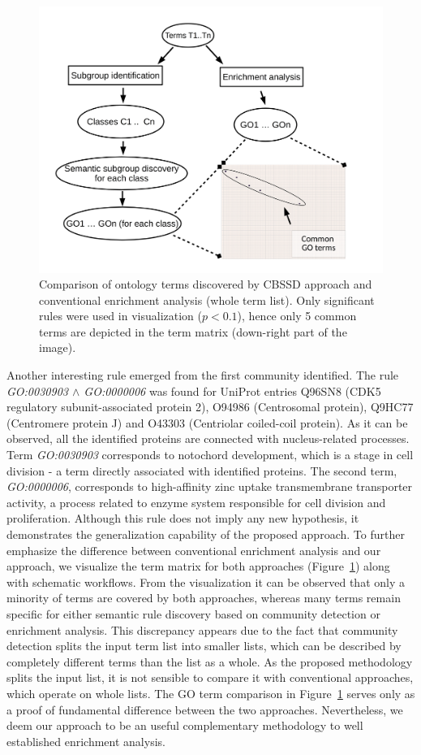 \documentclass[oribibl,runningheads,a4paper]{llncs}
\begin{document}
\begin{figure}[!h]
\centering
\includegraphics[scale=0.9]{result_nicer}
\caption{Comparison of ontology terms discovered by CBSSD approach and conventional enrichment analysis (whole term list). Only significant rules were used in visualization ($p<0.1$), hence only 5 common terms are depicted in the term matrix (down-right part of the image).}
\label{fig:example3}
\end{figure}

Another interesting rule emerged from the first community identified. The rule \emph{GO:0030903 $\wedge$  GO:0000006} was found for UniProt entries Q96SN8  (CDK5 regulatory subunit-associated protein 2), O94986 (Centrosomal protein), Q9HC77 (Centromere protein J) and O43303 (Centriolar coiled-coil protein). As it can be observed, all the identified proteins are connected with nucleus-related processes. Term \emph{GO:0030903} corresponds to notochord development, which is a stage in cell division - a term directly associated with identified proteins. The second term, \emph{GO:0000006}, corresponds to high-affinity zinc uptake transmembrane transporter activity, a process related to enzyme system responsible for cell division and proliferation. Although this rule does not imply any new hypothesis, it demonstrates the generalization capability of the proposed approach. To further emphasize the difference between conventional enrichment analysis and our approach, we visualize the term matrix for both approaches (Figure~\ref{fig:example3}) along with schematic workflows. From the visualization it can be observed that only a minority of terms are covered by both approaches, whereas many terms remain specific for either semantic rule discovery based on community detection or enrichment analysis. This discrepancy appears due to the fact that community detection splits the input term list into smaller lists, which can be described by completely different terms than the list as a whole. As the proposed methodology splits the input list, it is not sensible to compare it with conventional approaches, which operate on whole lists. The GO term comparison in Figure~\ref{fig:example3} serves only as a proof of fundamental difference between the two approaches. Nevertheless, we deem our approach to be an useful complementary methodology to well established enrichment analysis.
\end{document}
